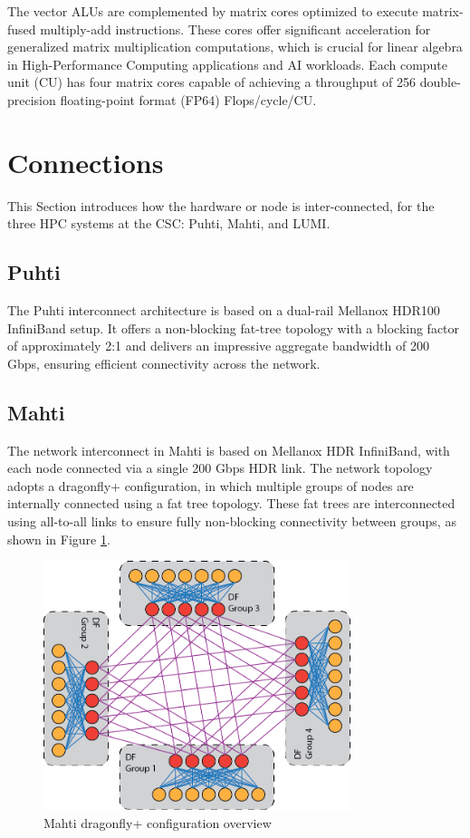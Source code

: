The vector ALUs are complemented by matrix cores optimized to execute matrix-fused multiply-add instructions. These cores offer significant acceleration for generalized matrix multiplication computations, which is crucial for linear algebra in High-Performance Computing applications and AI workloads. Each compute unit (CU) has four matrix cores capable of achieving a throughput of 256 double-precision floating-point format (FP64) Flops/cycle/CU.

\section{Connections}
This Section introduces how the hardware or node is inter-connected, for the three HPC systems at the CSC: Puhti, Mahti, and LUMI.

\subsection{Puhti}
The Puhti\cite{puhti} interconnect architecture is based on a dual-rail Mellanox HDR100 InfiniBand setup. It offers a non-blocking fat-tree topology with a blocking factor of approximately 2:1 and delivers an impressive aggregate bandwidth of 200 Gbps, ensuring efficient connectivity across the network.

\subsection{Mahti}
The network interconnect in Mahti is based on Mellanox HDR InfiniBand, with each node connected via a single 200 Gbps HDR link. The network topology adopts a dragonfly+ configuration, in which multiple groups of nodes are internally connected using a fat tree topology. These fat trees are interconnected using all-to-all links to ensure fully non-blocking connectivity between groups, as shown in Figure \ref{fig_mahti_df_ex}.

\begin{figure}[H]
    \centering
    \includegraphics[width=0.8\textwidth]{figures/mahti_df_ex.png}
    \caption{Mahti dragonfly+ configuration overview \cite{mahti}}
    \label{fig_mahti_df_ex}
\end{figure}

